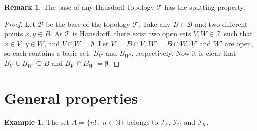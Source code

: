 \documentclass{amsart}
\theoremstyle{definition}
\newtheorem{remark}{Remark}
\theoremstyle{definition}
\newtheorem{ex}{Example}
\newcommand{\N}{{\mathbb N}}
\newcommand{\I}{\mathcal I}
\newcommand{\T}{\mathcal{T}}
\begin{document}


\begin{remark} \label{remH}
The base of any Hausdorff topology $\T$ has the splitting property.
\end{remark}
\begin{proof}
Let $\mathcal{B}$ be the base of the topology $\T$. Take any $B\in\mathcal{B}$ and two different points $x,y\in B$. As $\T$ is Hausdorff, there exist two open sets $V,W\in\T$ such that $x\in V$, $y\in W$, and $V\cap W = \emptyset$. Let $V'=B\cap V$, $W'=B\cap W$. $V'$ and $W'$ are open, so each contains a basic set: $B_{V'}$ and $B_{W'}$, respectively. Now it is clear that $B_{V'}\cup B_{W'}\subseteq B$ and $B_{V'}\cap B_{W'}=\emptyset$.
\end{proof}




\section{General properties}



\begin{ex} 
The set $A = \{n! \ :\ n\in\N\}$ belongs to $\I_F$, $\I_G$ and $\I_K$.
\end{ex}
\end{document}
